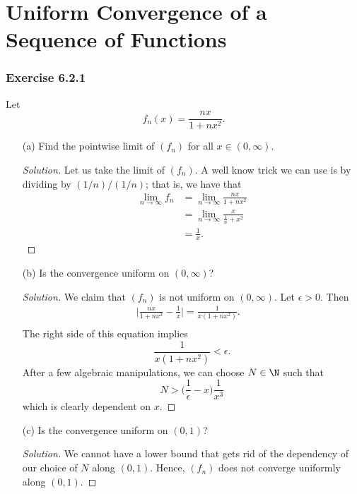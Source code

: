 \section{Uniform Convergence of a Sequence of Functions}

\subsubsection{Exercise 6.2.1} Let 
\[  f_n(x) = \frac{ nx }{ 1 + nx^2  }. \]
\begin{enumerate}
    \item[(a)] Find the pointwise limit of \( (f_n)  \) for all \( x \in (0, \infty ) \).
        \begin{proof}[Solution]
        Let us take the limit of \( (f_n)  \). A well know trick we can use is by dividing by \( (1/n) / (1/n)  \); that is, we have that
        \begin{align*}
            \lim_{ n \to \infty  } f_n &= \lim_{ n \to \infty  } \frac{ nx  }{  1 + nx^2  }  \\
                                       &= \lim_{ n \to \infty  } \frac{ x  }{ \frac{ 1 }{ n } + x^2  } \\
                                       &= \frac{ 1 }{ x  }.
        \end{align*}
        \end{proof}
    \item[(b)] Is the convergence uniform on \( (0,\infty)  \)?
        \begin{proof}[Solution]
        We claim that \( (f_n)  \) is not uniform on \( (0, \infty ) \). Let \( \epsilon > 0  \). Then 
        \begin{align*}
            \Big| \frac{ nx }{ 1 + nx^2  } -  \frac{ 1 }{ x }  \Big| = \frac{ 1  }{ x(1+nx^2 ) }.  &\\
        \end{align*}
        The right side of this equation implies 
        \[  \frac{ 1 }{ x(1+nx^2)  } < \epsilon. \]
        After a few algebraic manipulations, we can choose \( N \in \N  \) such that 
        \[  N > \Big( \frac{ 1 }{ \epsilon  } - x  \Big) \frac{ 1 }{ x^3  }  \]
        which is clearly dependent on \( x  \). 
        \end{proof}
    \item[(c)] Is the convergence uniform on \( (0,1)  \)? 
        \begin{proof}[Solution]
            We cannot have a lower bound that gets rid of the dependency of our choice of \( N   \) along \( (0,1)  \). Hence, \( (f_n)  \) does not converge uniformly along \( (0,1)  \).

\end{proof}
\end{enumerate}
